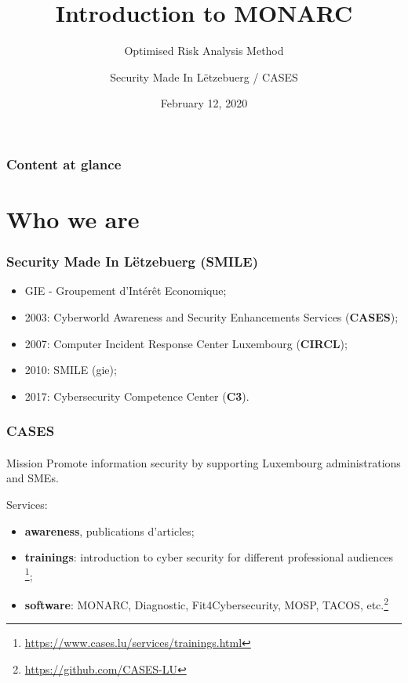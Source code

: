 \documentclass[]{beamer}
\title[Introduction to MONARC]{Introduction to MONARC}
\subtitle{Optimised Risk Analysis Method}
\author[Team CASES]{Security Made In Lëtzebuerg / CASES}
\institute[]{\href{https://www.cases.lu}{Cyberworld Awareness and Security Enhancements Services}}
\date{February 12, 2020}
\begin{document}
\begin{frame}
    \titlepage
\end{frame}



\setcounter{tocdepth}{1}
\begin{frame}
    \frametitle{Content at glance}
    \tableofcontents
\end{frame}
\setcounter{tocdepth}{4}



%
%
\section{Who we are}
\begin{frame}
    \frametitle{Security Made In Lëtzebuerg (SMILE)}
    \begin{center}
        \begin{itemize}
            \item GIE - Groupement d’Intérêt Economique;
            \item 2003: Cyberworld Awareness and Security Enhancements Services (\textbf{CASES});
            \item 2007: Computer Incident Response Center Luxembourg (\textbf{CIRCL});
            \item 2010: SMILE (gie);
            \item 2017: Cybersecurity Competence Center (\textbf{C3}).
        \end{itemize}
    \end{center}
\end{frame}

\begin{frame}
    \frametitle{CASES}
    \framesubtitle{}
    \begin{block}{Mission}
        Promote information security by supporting Luxembourg administrations and SMEs.
    \end{block}
    Services:
    \begin{center}
        \begin{itemize}
            \item \textbf{awareness}, publications d'articles;
            \item \textbf{trainings}:
                introduction to cyber security for different professional audiences \footnote{\url{https://www.cases.lu/services/trainings.html}};
            \item \textbf{software}:
                MONARC, Diagnostic, Fit4Cybersecurity, MOSP, TACOS, etc.\footnote{\url{https://github.com/CASES-LU}}
        \end{itemize}
    \end{center}
\end{frame}
\end{document}

